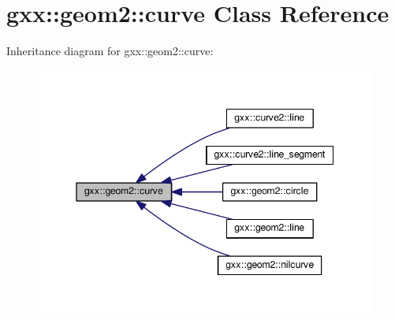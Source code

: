 \hypertarget{classgxx_1_1geom2_1_1curve}{}\section{gxx\+:\+:geom2\+:\+:curve Class Reference}
\label{classgxx_1_1geom2_1_1curve}


Inheritance diagram for gxx\+:\+:geom2\+:\+:curve\+:
\nopagebreak
\begin{figure}[H]
\begin{center}
\leavevmode
\includegraphics[width=345pt]{classgxx_1_1geom2_1_1curve__inherit__graph}
\end{center}
\end{figure}

